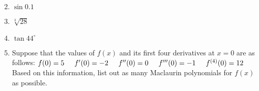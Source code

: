 \documentclass[12pt]{article}
\newif\ifans
\begin{document}
\begin{enumerate}
\setcounter{enumi}{1}

\item $\sin{0.1}$

\ifans{\fbox{{\parbox{1\linewidth}{$p_1(x)=p_2(x)=x$, so $\sin{0.1} \approx 0.1$ \\
Calculator: $\sin{0.1} \approx 0.09983341665$ }}}} \fi

\item $\sqrt[3]{28}$

\ifans{\fbox{\parbox{1\linewidth}{
$p_1(x)=3+\frac{1}{27}(x-27)$, so $\sqrt[3]{28} \approx p_1(28) = \frac{82}{27} = 3.\overline{037}$ \\ \\
$p_2(x)=3+\frac{1}{27}(x-27)-\frac{1}{2187}(x-27)^2$, so $\sqrt[3]{28} \approx p_2(28) = \frac{82}{27}-\frac{1}{2187} \approx 3.03657979$  \\ \\
Calculator: $\sqrt[3]{28} \approx 3.036588972$. }}}\fi

\item $\tan{44^\circ}$

\ifans{\fbox{\parbox{1\linewidth}{
$p_1(x)=1+2\left(x-\frac{\pi}{4}\right)$, so $\tan{44^\circ} \approx p_1\left(\frac{\pi}{4}-\frac{\pi}{180}\right) = 1-\frac{\pi}{90} \approx 0.965093415$ \\ \\
$p_2(x)=1+2\left(x-\frac{\pi}{4}\right)+2\left(x-\frac{\pi}{4}\right)^2$, so \\ 
$\tan{44^\circ} \approx p_2\left(\frac{\pi}{4}-\frac{\pi}{180}\right) = 1-\frac{\pi}{90} + \frac{2\pi^2}{(180)^2} \approx 0.9657026498$   \\ \\
Calculator: $\tan{44^\circ} \approx 0.9656887747$. }}}\fi

\item Suppose that the values of $f(x)$ and its first four derivatives at $x=0$ are as follows: \newline \newline
$f(0)=5 \hspace{5 mm} f^{\prime}(0)=-2 \hspace{5 mm} f^{\prime\prime}(0)=0 \hspace{5 mm} f^{\prime\prime\prime}(0)=-1 \hspace{5 mm} f^{(4)}(0)=12$ \newline \newline
Based on this information, list out as many Maclaurin polynomials for $f(x)$ as possible.


\end{enumerate}
\end{document}
